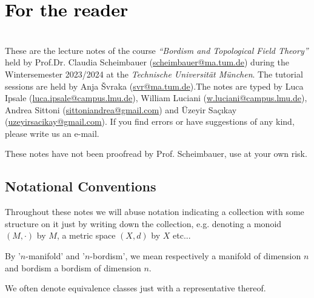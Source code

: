\chapter*{\huge{\textcolor{black}{For the reader}}}
\hfill
\vspace{0.50cm}\\
These are the lecture notes of the course \textit{``Bordism and Topological Field Theory''} held by Prof.\hspace{1mm}Dr. Claudia Scheimbauer (\href{mailto:scheimbauer@ma.tum.de}{scheimbauer@ma.tum.de}) during the Wintersemester 2023/2024 at the \textit{Technische Universität München}. The tutorial sessions are held by Anja \v{S}vraka (\href{mailto:svr@ma.tum.de}{svr@ma.tum.de}).\hspace{1.5mm}The notes are typed by Luca Ipsale (\href{mailto:luca.ipsale@campus.lmu.de}{luca.ipsale@campus.lmu.de}), William Luciani (\href{mailto:w.luciani@campus.lmu.de}{w.luciani@campus.lmu.de}), Andrea Sittoni (\href{mailto:sittoniandrea@gmail.com}{sittoniandrea@gmail.com}) and Üzeyir Sa\c{c}{\i}kay (\href{mailto:uzeyirsacikay@gmail.com}{uzeyirsacikay@gmail.com}). If you find
 errors or have suggestions of any kind, please write us an e-mail.

\vspace{1cm}

{\LARGE \warning These notes have not been proofread by Prof. Scheimbauer, use at your own risk}.

\updateinfo
\thispagestyle{empty}



\clearpage
\thispagestyle{empty}
\cleardoublepage
\section*{Notational Conventions}
\begin{notat}
    Throughout these notes we will abuse notation indicating a collection with some structure on it just by
     writing down the collection, e.g. denoting a monoid $(M,\cdot)$ by $M$, a metric space $(X,d)$ by
      $X$ etc...
\end{notat}
\begin{notat}
    By '$n$-manifold' and '$n$-bordism', we mean respectively a manifold of dimension $n$
     and bordism a bordism of dimension $n$.
\end{notat}
\begin{notat}
    We often denote equivalence classes just with a representative thereof. 
\end{notat}

